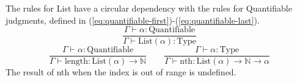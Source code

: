 \documentclass[11pt]{article}
\begin{document}
The rules for List have a circular dependency with the rules for
Quantifiable judgments, defined in (\ref{eq:quantifiable-first})-(\ref{eq:quantifiable-last}).
\begin{equation}
	\frac{\Gamma \vdash \alpha : \text{Quantifiable}}
	{\Gamma \vdash \text{List}(\alpha) : \text{Type}}
\end{equation}
\begin{equation}
	\frac{\Gamma \vdash \alpha : \text{Quantifiable}}
	{\Gamma \vdash \text{length} : \text{List}(\alpha) \to \mathbb{N}}
	\qquad
	\frac{\Gamma \vdash \alpha : \text{Type}}
	{\Gamma \vdash \text{nth} : \text{List}(\alpha) \to \mathbb{N} \to \alpha}
\end{equation}
The result of nth when the index is out of range is undefined.
\end{document}
